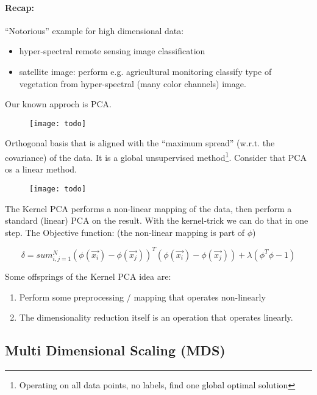 \paragraph{Recap:}
``Notorious'' example for high dimensional data:
\begin{itemize}
    \item hyper-spectral remote sensing image classification
    \item satellite image:  perform e.g. agricultural monitoring classify type of vegetation from hyper-spectral (many color channels) image.
\end{itemize}

Our known approch is PCA.

\begin{figure}[H]
	\centering
	\texttt{[image: todo]}
\end{figure}

Orthogonal basis that is aligned with the ``maximum spread'' (w.r.t. the covariance) of the data. It is a global unsupervised method\footnote{Operating on all data points, no labels, find one global optimal solution}. Consider that PCA os a linear method.

\begin{figure}[H]
	\centering
	\texttt{[image: todo]}
\end{figure}

The Kernel PCA performs a non-linear mapping of the data, then perform a standard (linear) PCA on the result. With the kernel-trick we can do that in one step. The Objective function: (the non-linear mapping is part of $\phi$)

\begin{equation*}
    \delta = sum_{i,j=1}^{N} (\phi(\vec{x_i}) - \phi(\vec{x_j}))^T (\phi(\vec{x_i}) - \phi(\vec{x_j})) + \lambda (\phi^T\phi-1)
\end{equation*}

Some offsprings of the Kernel PCA idea are:
\begin{enumerate}
    \item Perform some preprocessing / mapping that operates non-linearly
    \item The dimensionality reduction itself is an operation that operates linearly.
\end{enumerate}

\subsection*{Multi Dimensional Scaling (MDS)}
